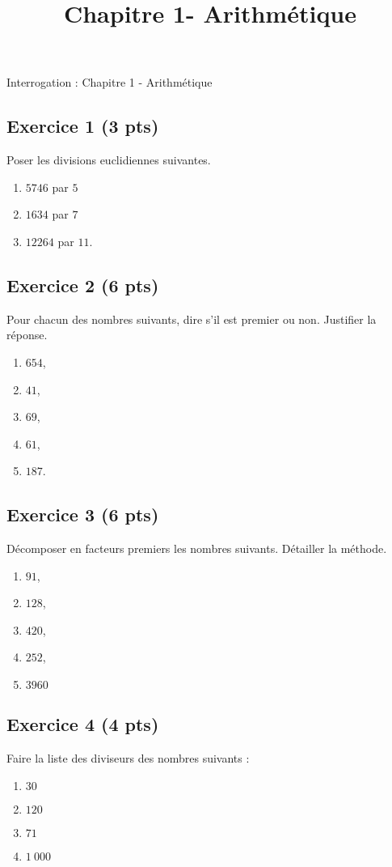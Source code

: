 \documentclass[14 pt]{extarticle}
\title{Chapitre 1-  Arithmétique}
\date{}
\theoremstyle{plain}
\begin{document}
\begin{center}{\Large Interrogation : Chapitre 1 - Arithmétique}\\ 
 \end{center}




\subsection*{Exercice 1 (3 pts)}
 Poser les divisions euclidiennes suivantes. 
 
 
 \begin{enumerate}
 \item $5746$ par $5$
 \item $1634$ par $7$ 
 \item $12 264$ par $11$. 
 \end{enumerate}
 \subsection*{Exercice 2 (6 pts)}
 
 Pour chacun des nombres suivants, dire s'il est premier ou non. Justifier la réponse. 
\begin{enumerate}
\item $654$,
\item $41$,
\item $69$,
\item $61$,
\item $187$.
\end{enumerate}

\subsection*{Exercice 3 (6 pts)}
Décomposer en facteurs premiers les nombres suivants. Détailler la méthode. 

\begin{enumerate}
\item $91$,
\item $128$,
\item $420$,
\item $252$,
\item $3960$
\end{enumerate}
\subsection*{Exercice 4 (4 pts)}
Faire la liste des diviseurs des nombres suivants : 
\begin{enumerate}
\item $30$
\item $120$
\item $71$
\item $1~000$
\end{enumerate}
\end{document}
